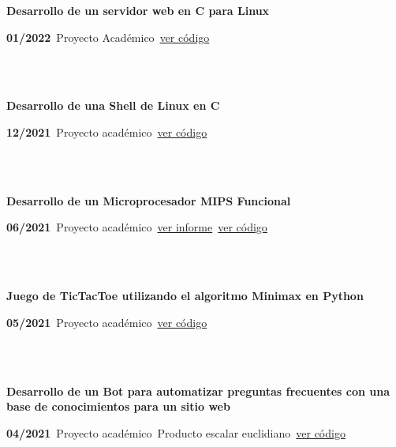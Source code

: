 \documentclass{article}
\begin{document}
\begin{minipage}{0.8\textwidth}
\parbox{0.8\linewidth}{\textbf{Desarrollo de un servidor web en C para Linux}} \hfill \textbf{01/2022}\
Proyecto Académico\
\href{https://github.com/geeksLabTech/web_server}{ver código}\
\end{minipage} \hfill {}\\\\
\begin{minipage}{0.8\textwidth}
    \parbox{0.8\linewidth}{\textbf{Desarrollo de una Shell de Linux en C}} \hfill \textbf{12/2021}\
    Proyecto académico\
    \href{https://github.com/geeksLabTech/SO_Shell}{ver código}\
    \end{minipage} \hfill {}\\\\
    \begin{minipage}{0.8\textwidth}
    \parbox{0.8\linewidth}{\textbf{Desarrollo de un Microprocesador MIPS Funcional}} \hfill \textbf{06/2021}\
    Proyecto académico\
    \href{https://github.com/JavierOramas/MIPS-Micro/blob/master/informe.pdf}{ver informe}\
    \href{https://github.com/JavierOramas/MIPS-Micro}{ver código}\
    \end{minipage} \hfill {}\\\\
    \begin{minipage}{0.8\textwidth}
    \parbox{0.8\linewidth}{\textbf{Juego de TicTacToe utilizando el algoritmo Minimax en Python}} \hfill \textbf{05/2021}\
    Proyecto académico\
    \href{https://github.com/JavierOramas/TicTacToe_AI}{ver código}\
    \end{minipage} \hfill {}\\\\
    \begin{minipage}{0.8\textwidth}
    \parbox{0.8\linewidth}{\textbf{Desarrollo de un Bot para automatizar preguntas frecuentes con una base de conocimientos para un sitio web}} \hfill \textbf{04/2021}\
    Proyecto académico\
    Producto escalar euclidiano\
    \href{https://github.com/JavierOramas/FAQ-Chat-Bot-Nous}{ver código}\
    \end{minipage} \hfill {}\\\\
\end{document}
